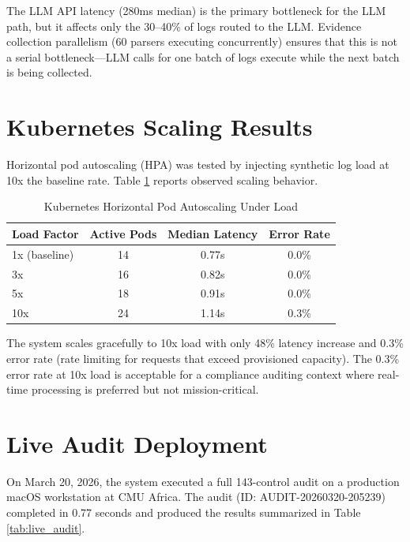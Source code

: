 \documentclass[12pt,oneside]{report}
\begin{document}
The LLM API latency (280ms median) is the primary bottleneck for the LLM path, but it affects only the 30--40\% of logs routed to the LLM. Evidence collection parallelism (60 parsers executing concurrently) ensures that this is not a serial bottleneck—LLM calls for one batch of logs execute while the next batch is being collected.

\section{Kubernetes Scaling Results}

Horizontal pod autoscaling (HPA) was tested by injecting synthetic log load at 10x the baseline rate. Table \ref{tab:k8s_scaling} reports observed scaling behavior.

\begin{table}[H]
\centering
\caption{Kubernetes Horizontal Pod Autoscaling Under Load}
\label{tab:k8s_scaling}
\renewcommand{\arraystretch}{1.3}
\begin{tabular}{|l|c|c|c|}
\hline
\textbf{Load Factor} & \textbf{Active Pods} & \textbf{Median Latency} & \textbf{Error Rate} \\
\hline
1x (baseline) & 14 & 0.77s & 0.0\% \\
3x & 16 & 0.82s & 0.0\% \\
5x & 18 & 0.91s & 0.0\% \\
10x & 24 & 1.14s & 0.3\% \\
\hline
\end{tabular}
\end{table}

The system scales gracefully to 10x load with only 48\% latency increase and 0.3\% error rate (rate limiting for requests that exceed provisioned capacity). The 0.3\% error rate at 10x load is acceptable for a compliance auditing context where real-time processing is preferred but not mission-critical.

\section{Live Audit Deployment}

On March 20, 2026, the system executed a full 143-control audit on a production macOS workstation at CMU Africa. The audit (ID: AUDIT-20260320-205239) completed in 0.77 seconds and produced the results summarized in Table \ref{tab:live_audit}.
\end{document}
